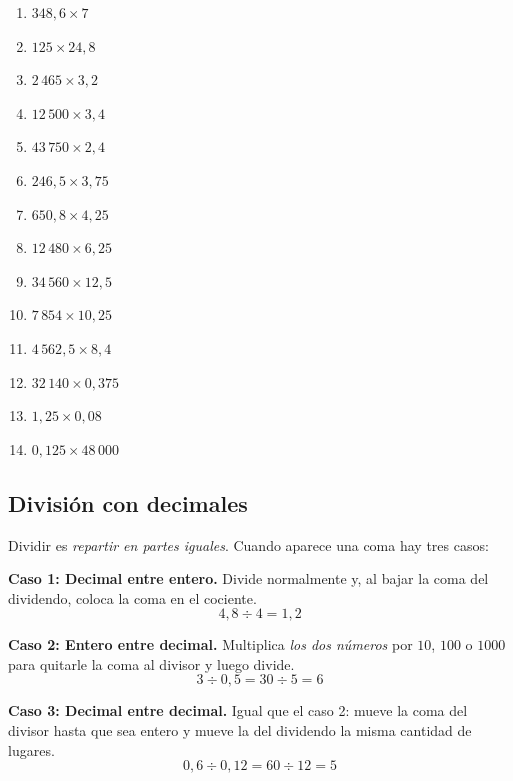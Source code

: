\documentclass[12pt, letterpaper]{article}
\begin{document}
\begin{enumerate}[leftmargin=*]
  \item \facil{} $348{,}6 \times 7$

  \item \facil{} $125 \times 24{,}8$

  \item \facil{} $2\,465 \times 3{,}2$

  \item \medio{} $12\,500 \times 3{,}4$

  \item \medio{} $43\,750 \times 2{,}4$

  \item \medio{} $246{,}5 \times 3{,}75$

  \item \medio{} $650{,}8 \times 4{,}25$

  \item \medio{} $12\,480 \times 6{,}25$

  \item \dificil{} $34\,560 \times 12{,}5$

  \item \dificil{} $7\,854 \times 10{,}25$

  \item \dificil{} $4\,562{,}5 \times 8{,}4$

  \item \dificil{} $32\,140 \times 0{,}375$

  \item \dificil{} $1{,}25 \times 0{,}08$

  \item \dificil{} $0{,}125 \times 48\,000$
\end{enumerate}

\newpage

\subsection{División con decimales}

Dividir es \emph{repartir en partes iguales}. Cuando aparece una coma hay tres casos:

\begin{cuadroteoria}
  \textbf{Caso 1: Decimal entre entero.} Divide normalmente y, al bajar la coma del dividendo, coloca la coma en el cociente.
  \[
    4{,}8 \div 4 = 1{,}2
  \]

  \textbf{Caso 2: Entero entre decimal.} Multiplica \emph{los dos números} por $10$, $100$ o $1000$ para quitarle la coma al divisor y luego divide.
  \[
    3 \div 0{,}5 = 30 \div 5 = 6
  \]

  \textbf{Caso 3: Decimal entre decimal.} Igual que el caso 2: mueve la coma del divisor hasta que sea entero y mueve la del dividendo la misma cantidad de lugares.
  \[
    0{,}6 \div 0{,}12 = 60 \div 12 = 5
  \]
\end{cuadroteoria}
\end{document}
